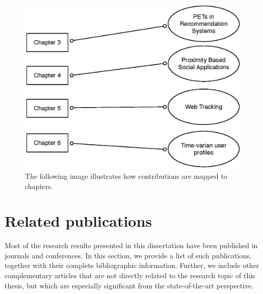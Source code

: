 \begin{figure}
\includegraphics[width=\textwidth]{figures/tesis-map.eps}
\caption[Advertising services feedback loop]{The following image illustrates how contributions are mapped to chapters.}
\label{fig:contributions}
\end{figure}

\section{Related publications}

Most of the research results presented in this dissertation have been published in journals and conferences. In this section, we provide a list of such publications, together with their complete bibliographic information. Further, we include other complementary articles that are not directly related to the research topic of this thesis, but which are especially
significant from the state-of-the-art perspective.

